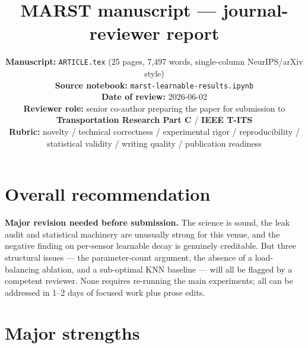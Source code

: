 \documentclass[11pt]{article}
\title{\vspace{-1.2cm}\sffamily\bfseries
       MARST manuscript --- journal-reviewer report}
\author{}
\date{\vspace{-2.5em}\sffamily\small
      \textbf{Manuscript:} \texttt{ARTICLE.tex} (25 pages, 7{,}497 words,
      single-column NeurIPS/arXiv style)\\
      \textbf{Source notebook:} \texttt{marst-learnable-results.ipynb}\\
      \textbf{Date of review:} 2026-06-02\\
      \textbf{Reviewer role:} senior co-author preparing the paper for
      submission to \textbf{Transportation Research Part C} / \textbf{IEEE T-ITS}\\
      \textbf{Rubric:} novelty / technical correctness / experimental rigor /
      reproducibility / statistical validity / writing quality /
      publication readiness}
\begin{document}
\maketitle
\thispagestyle{fancy}

\section{Overall recommendation}

\noindent\textbf{Major revision needed before submission.}  The science
is sound, the leak audit and statistical machinery are unusually strong
for this venue, and the negative finding on per-sensor learnable decay
is genuinely creditable.  But three structural issues --- the
parameter-count argument, the absence of a load-balancing ablation, and
a sub-optimal KNN baseline --- will all be flagged by a competent
reviewer.  None requires re-running the main experiments; all can be
addressed in 1--2 days of focused work plus prose edits.

\section{Major strengths}
\end{document}
